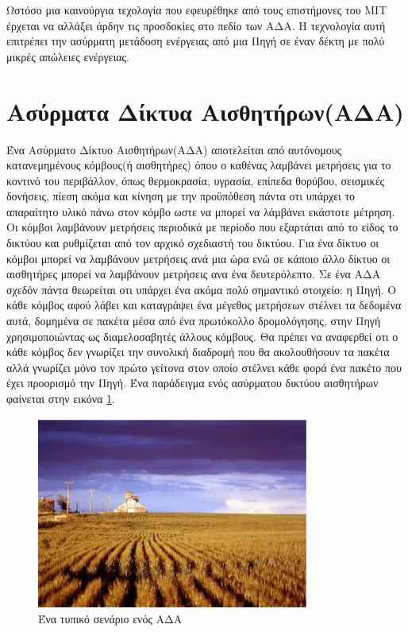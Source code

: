 Ωστόσο μια καινούργια τεχολογία που εφευρέθηκε από τους επιστήμονες του MIT \cite{power_mit_1} έρχεται να αλλάξει άρδην τις προσδοκίες στο πεδίο των ΑΔΑ. Η τεχνολογία
αυτή επιτρέπει την ασύρματη μετάδοση ενέργειας από μια Πηγή σε έναν δέκτη με πολύ μικρές απώλειες ενέργειας.






\section{Ασύρματα Δίκτυα Αισθητήρων(ΑΔΑ)}
Ένα Ασύρματο Δίκτυο Αισθητήρων(ΑΔΑ) αποτελείται από αυτόνομους κατανεμημένους κόμβους(ή αισθητήρες) όπου ο καθένας λαμβάνει μετρήσεις για το κοντινό του περιβάλλον,
όπως θερμοκρασία, υγρασία, επίπεδα θορύβου, σεισμικές δονήσεις, πίεση ακόμα και κίνηση με την προϋπόθεση πάντα οτι υπάρχει το απαραίτητο υλικό πάνω στον κόμβο ωστε
να μπορεί να λάμβάνει εκάστοτε μέτρηση.
Οι κόμβοι λαμβάνουν μετρήσεις περιοδικά με περίοδο που εξαρτάται από το είδος το δικτύου και ρυθμίζεται από τον αρχικό σχεδιαστή του δικτύου.
Για ένα δίκτυο οι κόμβοι μπορεί να λαμβάνουν μετρήσεις ανά μια ώρα ενώ σε κάποιο άλλο δίκτυο οι αισθητήρες μπορεί να λαμβάνουν μετρήσεις ανα ένα δευτερόλεπτο.
Σε ένα ΑΔΑ σχεδόν πάντα θεωρείται οτι υπάρχει ένα ακόμα πολύ σημαντικό στοιχείο: η Πηγή.
Ο κάθε κόμβος αφού λάβει και καταγράψει ένα μέγεθος μετρήσεων στέλνει τα δεδομένα αυτά, δομημένα σε πακέτα μέσα από ένα πρωτόκολλο δρομολόγησης, στην Πηγή
χρησιμοποιώντας ως διαμελοσαβητές άλλους κόμβους.
Θα πρέπει να αναφερθεί οτι ο κάθε κόμβος δεν γνωρίζει την συνολική διαδρομή που θα ακολουθήσουν τα πακέτα αλλά γνωρίζει μόνο τον πρώτο γείτονα στον οποίο στέλνει κάθε
φορά ένα πακέτο που έχει προορισμό την Πηγή. Ένα παράδειγμα ενός ασύρματου δικτύου αισθητήρων φαίνεται στην εικόνα \ref{fig:farm}.

\begin{figure}[h]
	\centering
	\includegraphics[width=0.8\textwidth]{images/farm.eps}
	\caption{Ένα τυπικό σενάριο ενός ΑΔΑ}
	\label{fig:farm}
\end{figure}

